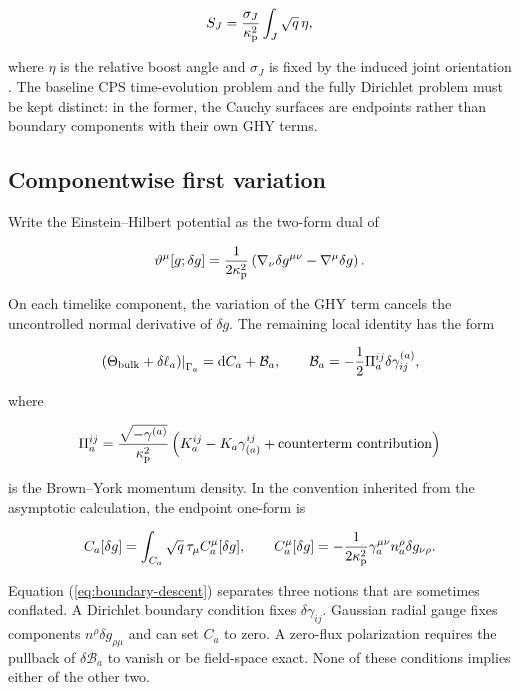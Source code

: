 \begin{align}
S_J=\frac{\sigma_J}{\kappa_{\rm p}^{2}}
\int_J\sqrt q\,\eta,
\end{align}

where $\eta$ is the relative boost angle and $\sigma_J$ is fixed by the induced joint orientation \cite{Hayward:1993my,Lehner:2016vdi}. The baseline CPS time-evolution problem and the fully Dirichlet problem must be kept distinct: in the former, the Cauchy surfaces are endpoints rather than boundary components with their own GHY terms.

\subsection{Componentwise first variation}\label{subsec:first-variation}

Write the Einstein--Hilbert potential as the two-form dual of

\begin{align}
\vartheta^\mu[g;\delta g]
=\frac1{2\kappa_{\rm p}^{2}}
\left(\nabla_\nu\delta g^{\mu\nu}-\nabla^\mu\delta g\right).
\end{align}

On each timelike component, the variation of the GHY term cancels the uncontrolled normal derivative of $\delta g$. The remaining local identity has the form

\begin{align}
\left.(\Theta_{\rm bulk}+\delta\ell_a)\right|_{\Gamma_a}
=\mathrm d C_a+\mathcal B_a,
\qquad
\mathcal B_a=-\frac12\Pi_a^{ij}\delta\gamma^{(a)}_{ij}, \label{eq:boundary-descent}
\end{align}

where

\begin{align}
\Pi_a^{ij}
=\frac{\sqrt{-\gamma^{(a)}}}{\kappa_{\rm p}^{2}}
\left(K_a^{ij}-K_a\gamma_{(a)}^{ij}
+\text{counterterm contribution}\right)
\end{align}

is the Brown--York momentum density. In the convention inherited from the asymptotic calculation, the endpoint one-form is

\begin{align}
C_a[\delta g]
=\int_{C_a}\sqrt q\,\tau_\mu C_a^\mu[\delta g],
\qquad
C_a^\mu[\delta g]
=-\frac1{2\kappa_{\rm p}^{2}}
\gamma_a^{\mu\nu}n_a^\rho\delta g_{\nu\rho}.
\end{align}

Equation (\ref{eq:boundary-descent}) separates three notions that are sometimes conflated. A Dirichlet boundary condition fixes $\delta\gamma_{ij}$. Gaussian radial gauge fixes components $n^\rho\delta g_{\rho\mu}$ and can set $C_a$ to zero. A zero-flux polarization requires the pullback of $\delta\mathcal B_a$ to vanish or be field-space exact. None of these conditions implies either of the other two.

